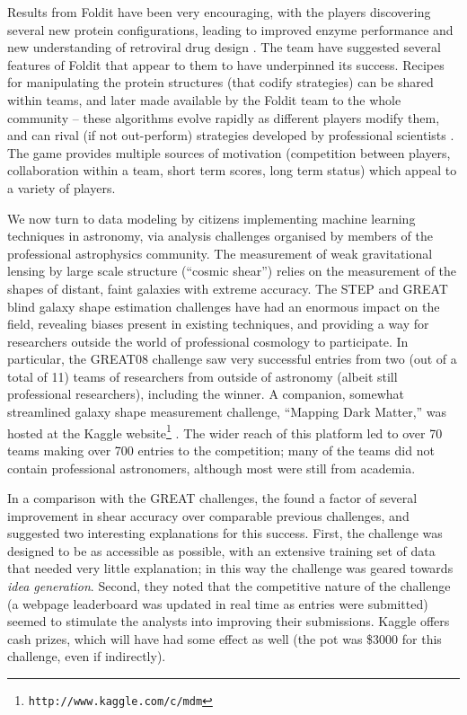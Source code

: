 \documentclass{ar2e}
\def\CaseStudy#1{\noindent{\it\bf #1 \,\,\,\,}}
\def\url#1{\texttt{#1}}
\begin{document}
Results from Foldit have been very encouraging, with the players discovering
several new protein configurations, leading to improved enzyme performance 
\citep{Eiben++2012} and new understanding of retroviral drug design
\citep{Khatib++2011a}. The team have suggested several features of Foldit that
appear to them to have underpinned its success. Recipes for manipulating the
protein structures (that codify strategies) can be shared within teams, and
later made available by the Foldit team to the whole community -- these
algorithms evolve rapidly as different players modify them, and can rival (if
not out-perform) strategies developed by professional scientists 
\citep{Khatib++2011b}. The game provides multiple sources of motivation
(competition between players, collaboration within a team, short term scores,
long term status) which appeal to a variety of players. 



\CaseStudy{Online Data Challenges}
We now turn to data modeling by citizens implementing machine learning
techniques in astronomy, via analysis challenges organised by members of the
professional astrophysics community. The measurement of weak gravitational
lensing by large scale structure (``cosmic shear'') relies on the measurement of
the shapes of distant, faint galaxies with extreme accuracy. The STEP
\citep{HeymansEtal2006,MasseyEtal2007} and GREAT
\citep{BridleEtal2010,KitchingEtal2012,KitchingEtal2013a} blind galaxy shape
estimation challenges have had an enormous impact on the field, revealing biases
present in existing techniques, and providing a way for researchers outside the
world of professional cosmology to participate. In particular, the GREAT08
challenge saw very successful entries from two (out of a total of 11) teams of
researchers from outside of astronomy (albeit still professional researchers),
including the winner. A companion, somewhat streamlined galaxy shape measurement
challenge, ``Mapping Dark Matter,'' was hosted at the Kaggle
website\footnote{\url{http://www.kaggle.com/c/mdm}} \citep{KitchingEtal2013b}.
The wider reach of this platform led to over 70 teams making over 700 entries to
the competition; many of the teams did not contain professional astronomers,
although most were still from academia.

In a comparison with the GREAT challenges, the \citeauthor{KitchingEtal2013b}
found a factor of several improvement in shear accuracy over comparable previous
challenges, and suggested two interesting explanations for this success. First,
the challenge was designed to be as accessible as possible, with an extensive
training set of data that needed very little explanation; in this way the
challenge was geared towards {\it idea generation}. Second, they noted that the
competitive  nature of the challenge (a webpage leaderboard was updated in real
time as entries were submitted) seemed to stimulate the analysts into improving
their submissions. Kaggle offers cash prizes, which will have had some effect as
well (the pot was \$3000 for this challenge, even if indirectly).
\end{document}
